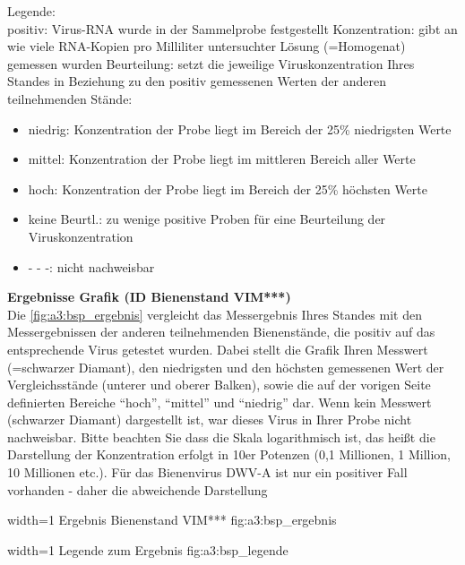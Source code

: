 


Legende:\\
positiv: Virus-RNA wurde in der Sammelprobe festgestellt
Konzentration: gibt an wie viele RNA-Kopien pro Milliliter untersuchter Lösung (=Homogenat)
gemessen wurden
Beurteilung: setzt die jeweilige Viruskonzentration Ihres Standes in Beziehung zu den positiv
gemessenen Werten der anderen teilnehmenden Stände:
\begin{itemize}
    \item niedrig: Konzentration der Probe liegt im Bereich der 25\% niedrigsten Werte
    \item mittel: Konzentration der Probe liegt im mittleren Bereich aller Werte
    \item hoch: Konzentration der Probe liegt im Bereich der 25\% höchsten Werte
    \item keine Beurtl.: zu wenige positive Proben für eine Beurteilung der Viruskonzentration
    \item - - -: nicht nachweisbar
\end{itemize}

\textbf{Ergebnisse Grafik (ID Bienenstand VIM***)}\\
Die \cref{fig:a3:bsp_ergebnis} vergleicht das Messergebnis Ihres Standes mit den Messergebnissen der anderen
teilnehmenden Bienenstände, die positiv auf das entsprechende Virus getestet wurden. Dabei stellt die Grafik Ihren Messwert (=schwarzer Diamant), den niedrigsten und den höchsten
gemessenen Wert der Vergleichsstände (unterer und oberer Balken), sowie die auf der vorigen
Seite definierten Bereiche “hoch”, “mittel” und “niedrig” dar. Wenn kein Messwert (schwarzer
Diamant) dargestellt ist, war dieses Virus in Ihrer Probe nicht nachweisbar. Bitte beachten Sie
dass die Skala logarithmisch ist, das heißt die Darstellung der Konzentration erfolgt in 10er
Potenzen (0,1 Millionen, 1 Million, 10 Millionen etc.). Für das Bienenvirus DWV-A ist nur ein
positiver Fall vorhanden - daher die abweichende Darstellung


  {width=1\textwidth} %
  {Ergebnis Bienenstand VIM***} %
  {} %
  {fig:a3:bsp_ergebnis} %
  
  {width=1\textwidth} %
  {Legende zum Ergebnis} %
  {} %
  {fig:a3:bsp_legende} %



